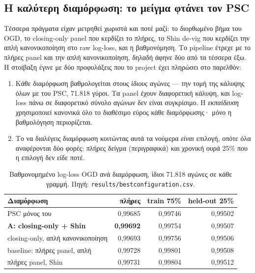 \documentclass[11pt,a4paper]{article}
\newcommand{\file}[1]{\texttt{#1}}
\renewcommand{\_}{\oldunderscore\allowbreak}
\begin{document}
\subsection{Η καλύτερη διαμόρφωση: το μείγμα φτάνει τον PSC}
\label{sec:bestconfig}

Τέσσερα πράγματα είχαν μετρηθεί χωριστά και ποτέ μαζί: το διορθωμένο βήμα του OGD, το
closing-only panel που κερδίζει το πλήρες, το Shin de-vig που κερδίζει την απλή
κανονικοποίηση στο raw log-loss, και η βαθμονόμηση. Το pipeline έτρεχε με το πλήρες panel και
την απλή κανονικοποίηση, δηλαδή άφηνε δύο από τα τέσσερα έξω. Η στοίβαξη έγινε με δύο
προφυλάξεις που το project έχει πληρώσει στο παρελθόν:

\begin{enumerate}
  \item Κάθε διαμόρφωση βαθμολογείται στους \emph{ίδιους} αγώνες --- την τομή της κάλυψης
        όλων με του PSC, 71.818 γύροι. Τα panel έχουν διαφορετική κάλυψη, και log-loss πάνω
        σε διαφορετικό σύνολο αγώνων δεν είναι συγκρίσιμο. Η \emph{εκπαίδευση} χρησιμοποιεί
        κανονικά όλο το διαθέσιμο εύρος κάθε διαμόρφωσης· μόνο η βαθμολόγηση περιορίζεται.
  \item Το να διαλέγεις διαμόρφωση κοιτώντας αυτά τα νούμερα \emph{είναι} επιλογή, οπότε όλα
        αναφέρονται δύο φορές: πλήρες δείγμα (περιγραφικά) και χρονική ουρά 25\% που η
        επιλογή δεν είδε ποτέ.
\end{enumerate}

\begin{table}[h]
\centering
\begin{tabular}{@{}lrrr@{}}
\toprule
\textbf{Διαμόρφωση} & \textbf{πλήρες} & \textbf{train 75\%} & \textbf{held-out 25\%} \\
\midrule
PSC μόνος του                        & 0,99685 & 0,99746 & 0,99502 \\
\textbf{A: closing-only + Shin}      & \textbf{0,99692} & 0,99754 & 0,99507 \\
closing-only, απλή κανονικοποίηση    & 0,99693 & 0,99756 & 0,99506 \\
baseline: πλήρες panel, απλή         & 0,99728 & 0,99801 & 0,99508 \\
πλήρες panel, Shin                   & 0,99731 & 0,99804 & 0,99512 \\
\bottomrule
\end{tabular}
\caption{Βαθμονομημένο log-loss OGD ανά διαμόρφωση, ίδιοι 71.818 αγώνες σε κάθε γραμμή.
Πηγή: \file{results/best\_configuration.csv}.}
\end{table}
\end{document}

